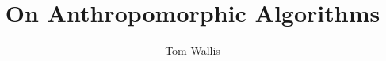 



\author{Tom Wallis}
\title{On Anthropomorphic Algorithms}  %
\date{}
\maketitle

\tableofcontents
\newpage

\begin{abstract}

\end{abstract}









\printbibliography


